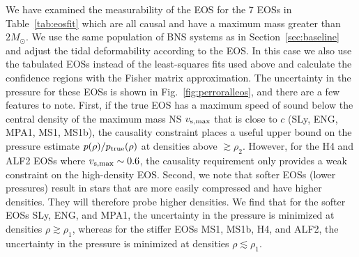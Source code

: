 \documentclass[twocolumn,prd,amssymb,aps,nofootinbib,showpacs,epsf]{revtex4}
\begin{document}
We have examined the measurability of the EOS for the 7 EOSs in Table~\ref{tab:eosfit} which are all causal and have a maximum mass greater than $2M_\odot$. We use the same population of BNS systems as in Section~\ref{sec:baseline} and adjust the tidal deformability according to the EOS. In this case we also use the tabulated EOSs instead of the least-squares fits used above and calculate the confidence regions with the Fisher matrix approximation. The uncertainty in the pressure for these EOSs is shown in Fig.~\ref{fig:perroralleos}, and there are a few features to note. First, if the true EOS has a maximum speed of sound below the central density of the maximum mass NS $v_{\rm s, max}$ that is close to $c$ (SLy, ENG, MPA1, MS1, MS1b), the causality constraint places a useful upper bound on the pressure estimate $p(\rho)/p_{\rm true}(\rho)$ at densities above $\gtrsim \rho_2$. However, for the H4 and ALF2 EOSs where $v_{\rm s, max} \sim 0.6$, the causality requirement only provides a weak constraint on the high-density EOS. Second, we note that softer EOSs (lower pressures) result in stars that are more easily compressed and have higher densities. They will therefore probe higher densities. We find that for the softer EOSs SLy, ENG, and MPA1, the uncertainty in the pressure is minimized at densities $\rho \gtrsim \rho_1$, whereas for the stiffer EOSs MS1, MS1b, H4, and ALF2, the uncertainty in the pressure is minimized at densities $\rho \lesssim \rho_1$.
\end{document}
